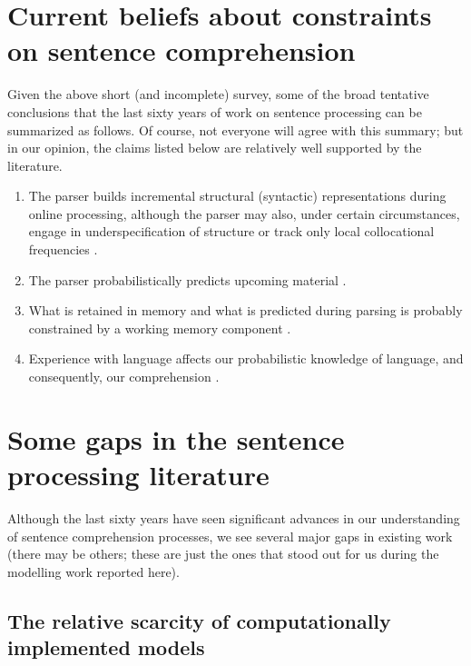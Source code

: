 \documentclass{cambridge7A}\usepackage[]{graphicx}\usepackage[]{color}
\begin{document}
\section{Current beliefs about constraints on sentence comprehension}

Given the above short (and incomplete) survey, some of the broad tentative conclusions that the last sixty years of work on sentence processing
can be summarized as follows. Of course, not everyone will agree with this summary; but in our opinion, the claims listed below are relatively well supported by the literature. 

\begin{enumerate}
\item The parser builds incremental structural (syntactic) representations during online processing, although the parser may also, under certain circumstances, engage in underspecification of structure or  track only local collocational frequencies \citep{FrazierRayner1982,TraxlerPickeringClifton1998,SwetsDesmetClifton2008,taboretal04}.
\item The parser probabilistically predicts upcoming material \citep{Hale2001,Levy2008}. 
\item What is retained in memory and what is predicted during parsing is probably constrained by a working memory component \citep{Gibson1998,Gibson2000,SafaviEtAlFrontiers2016,HusainEtAl2014,HusainVasishthNarayanan2015}. 
\item Experience with language affects our probabilistic knowledge of language, and consequently, our comprehension \citep{MacDonaldChristiansen2002,wellsetal}. 
\end{enumerate}

\section{Some gaps in the sentence processing literature}

Although the last sixty years have seen significant advances in our understanding of sentence comprehension processes, we see several major gaps in existing work (there may be others; these are just the ones that stood out for us during the modelling work reported here). 

\subsection{The relative scarcity of computationally implemented models}
\end{document}
